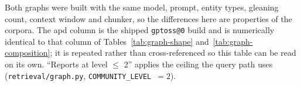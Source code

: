 \begin{table}[htbp]
  \vspace{0.5em}
  \footnotesize
  Both graphs were built with the same model, prompt, entity types, gleaning count, context window
  and chunker, so the differences here are properties of the corpora. The apd column is the shipped
  \texttt{gptoss@0} build and is numerically identical to that column of
  Tables~\ref{tab:graph-shape} and~\ref{tab:graph-composition}; it is repeated rather than
  cross-referenced so this table can be read on its own. ``Reports at level $\le$ 2'' applies the
  ceiling the query path uses (\texttt{retrieval/graph.py}, \texttt{COMMUNITY\_LEVEL}~$=2$).
\end{table}
